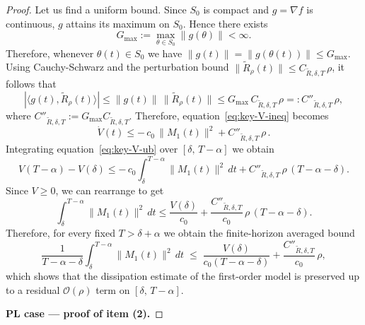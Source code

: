 \documentclass{article} %
\def\eqref#1{equation~\ref{#1}}
\begin{document}
\begin{proof}
Let us find a uniform bound. Since $S_0$ is compact and $g=\nabla f$ is continuous, $g$ attains its maximum on $S_0$. Hence there exists
\[
G_{\max}:=\max_{\theta\in S_0}\|g(\theta)\|<\infty.
\]
Therefore, whenever $\theta(t)\in S_0$ we have $\|g(t)\|=\|g(\theta(t))\|\le G_{\max}$. Using Cauchy-Schwarz and the perturbation bound $\|\widetilde R_\rho(t)\|\le C_{\widetilde R,\delta,T}\,\rho$, it follows that
\[
|\langle g(t),\widetilde R_\rho(t)\rangle|
\le \|g(t)\|\,\|\widetilde R_\rho(t)\|
\le G_{\max}\,C_{\widetilde R,\delta,T}\,\rho
=: C''_{\widetilde R,\delta,T}\,\rho,
\]
where $C''_{\widetilde R,\delta,T}:=G_{\max}C_{\widetilde R,\delta,T}$. Therefore, \eqref{eq:key-V-ineq} becomes
\begin{equation}\label{eq:key-V-ub}
\dot V(t)
\le
-\,c_0\,\|M_1(t)\|^2
+
C''_{\widetilde R,\delta,T}\,\rho\,.
\end{equation}
Integrating \eqref{eq:key-V-ub} over $[\delta,\,T-\alpha]$ we obtain
\[
V(T-\alpha) - V(\delta)
\le
-\,c_0 \int_\delta^{T-\alpha} \|M_1(t)\|^2\,dt
+
C''_{\widetilde R,\delta,T}\,\rho\,(T - \alpha-\delta).
\]
Since $V\ge 0$, we can rearrange to get
\[
\int_\delta^{T-\alpha} \|M_1(t)\|^2\,dt
\le
\frac{V(\delta)}{c_0}
+
\frac{C''_{\widetilde R,\delta,T}}{c_0}\,\rho\,(T-\alpha -\delta).
\]
Therefore, for every fixed $T>\delta+\alpha$ we obtain the finite-horizon averaged bound
\[
\frac{1}{T-\alpha-\delta}\int_\delta^{T-\alpha} \|M_1(t)\|^2\,dt 
\;\le\; \frac{V(\delta)}{c_0(T-\alpha-\delta)} + \frac{C''_{\widetilde R,\delta,T}}{c_0}\,\rho,
\]
which shows that the dissipation estimate of the first-order model is preserved up to a residual $\mathcal{O}(\rho)$ term on $[\delta,\,T-\alpha]$.

\medskip
\textbf{PL case — proof of item (2).}


\end{proof}
\end{document}
